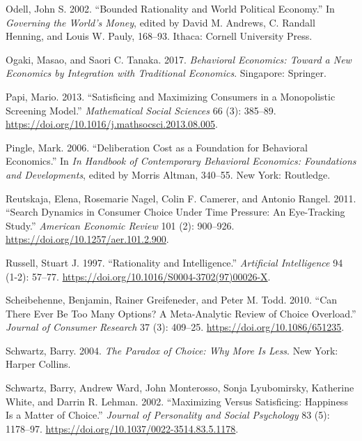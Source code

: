 \documentclass[
  11pt,
  letterpaper,
  DIV=11,
  numbers=noendperiod,
  oneside]{scrartcl}
\newlength{\cslhangindent}
\newenvironment{CSLReferences}[2] %
 {\begin{list}{}{%
  \setlength{\itemindent}{0pt}
  \setlength{\leftmargin}{0pt}
  \setlength{\parsep}{0pt}
  \ifodd #1
   \setlength{\leftmargin}{\cslhangindent}
   \setlength{\itemindent}{-1\cslhangindent}
  \fi
  \setlength{\itemsep}{#2\baselineskip}}}
 {\end{list}}
\begin{document}
\begin{CSLReferences}{1}{0}
Odell, John S. 2002. {``Bounded Rationality and World Political
Economy.''} In \emph{Governing the World's Money}, edited by David M.
Andrews, C. Randall Henning, and Louis W. Pauly, 168--93. Ithaca:
Cornell University Press.

Ogaki, Masao, and Saori C. Tanaka. 2017. \emph{Behavioral Economics:
Toward a New Economics by Integration with Traditional Economics}.
Singapore: Springer.

Papi, Mario. 2013. {``Satisficing and Maximizing Consumers in a
Monopolistic Screening Model.''} \emph{Mathematical Social Sciences} 66
(3): 385--89. \url{https://doi.org/10.1016/j.mathsocsci.2013.08.005}.

Pingle, Mark. 2006. {``Deliberation Cost as a Foundation for Behavioral
Economics.''} In \emph{In Handbook of Contemporary Behavioral Economics:
Foundations and Developments}, edited by Morris Altman, 340--55. New
York: Routledge.

Reutskaja, Elena, Rosemarie Nagel, Colin F. Camerer, and Antonio Rangel.
2011. {``Search Dynamics in Consumer Choice Under Time Pressure: An
Eye-Tracking Study.''} \emph{American Economic Review} 101 (2):
900--926. \url{https://doi.org/10.1257/aer.101.2.900}.

Russell, Stuart J. 1997. {``Rationality and Intelligence.''}
\emph{Artificial Intelligence} 94 (1-2): 57--77.
\url{https://doi.org/10.1016/S0004-3702(97)00026-X}.

Scheibehenne, Benjamin, Rainer Greifeneder, and Peter M. Todd. 2010.
{``Can There Ever Be Too Many Options? A Meta-Analytic Review of Choice
Overload.''} \emph{Journal of Consumer Research} 37 (3): 409--25.
\url{https://doi.org/10.1086/651235}.

Schwartz, Barry. 2004. \emph{The Paradox of Choice: Why More Is Less}.
New York: Harper Collins.

Schwartz, Barry, Andrew Ward, John Monterosso, Sonja Lyubomirsky,
Katherine White, and Darrin R. Lehman. 2002. {``Maximizing Versus
Satisficing: Happiness Is a Matter of Choice.''} \emph{Journal of
Personality and Social Psychology} 83 (5): 1178--97.
\url{https://doi.org/10.1037/0022-3514.83.5.1178}.


\end{CSLReferences}
\end{document}

